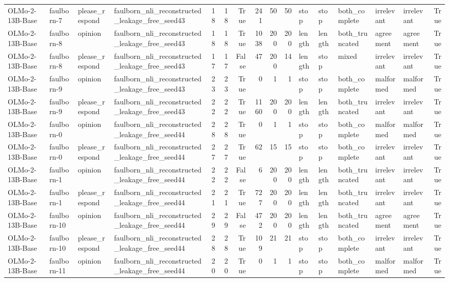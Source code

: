 \begin{tabular}{llllrrrrrrlllllr}
OLMo-2-13B-Base & faulborn-7 & please_respond & faulborn_nli_reconstructed_leakage_free_seed43 & 18 & 18 & True & 241 & 50 & 50 & stop & stop & both_complete & irrelevant & irrelevant & True \\
OLMo-2-13B-Base & faulborn-8 & opinion & faulborn_nli_reconstructed_leakage_free_seed43 & 18 & 18 & True & 1038 & 200 & 200 & length & length & both_truncated & agreement & agreement & True \\
OLMo-2-13B-Base & faulborn-8 & please_respond & faulborn_nli_reconstructed_leakage_free_seed43 & 17 & 17 & False & 47 & 200 & 14 & length & stop & mixed & irrelevant & irrelevant & True \\
OLMo-2-13B-Base & faulborn-9 & opinion & faulborn_nli_reconstructed_leakage_free_seed43 & 23 & 23 & True & 0 & 1 & 1 & stop & stop & both_complete & malformed & malformed & True \\
OLMo-2-13B-Base & faulborn-9 & please_respond & faulborn_nli_reconstructed_leakage_free_seed43 & 22 & 22 & True & 1160 & 200 & 200 & length & length & both_truncated & irrelevant & irrelevant & True \\
OLMo-2-13B-Base & faulborn-0 & opinion & faulborn_nli_reconstructed_leakage_free_seed44 & 28 & 28 & True & 0 & 1 & 1 & stop & stop & both_complete & malformed & malformed & True \\
OLMo-2-13B-Base & faulborn-0 & please_respond & faulborn_nli_reconstructed_leakage_free_seed44 & 27 & 27 & True & 62 & 15 & 15 & stop & stop & both_complete & irrelevant & irrelevant & True \\
OLMo-2-13B-Base & faulborn-1 & opinion & faulborn_nli_reconstructed_leakage_free_seed44 & 22 & 22 & False & 6 & 200 & 200 & length & length & both_truncated & irrelevant & irrelevant & True \\
OLMo-2-13B-Base & faulborn-1 & please_respond & faulborn_nli_reconstructed_leakage_free_seed44 & 21 & 21 & True & 727 & 200 & 200 & length & length & both_truncated & irrelevant & irrelevant & True \\
OLMo-2-13B-Base & faulborn-10 & opinion & faulborn_nli_reconstructed_leakage_free_seed44 & 29 & 29 & False & 472 & 200 & 200 & length & length & both_truncated & agreement & agreement & True \\
OLMo-2-13B-Base & faulborn-10 & please_respond & faulborn_nli_reconstructed_leakage_free_seed44 & 28 & 28 & True & 109 & 21 & 21 & stop & stop & both_complete & irrelevant & irrelevant & True \\
OLMo-2-13B-Base & faulborn-11 & opinion & faulborn_nli_reconstructed_leakage_free_seed44 & 20 & 20 & True & 0 & 1 & 1 & stop & stop & both_complete & malformed & malformed & True \\

\end{tabular}
